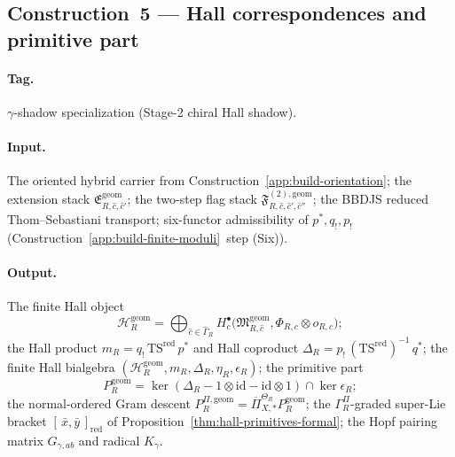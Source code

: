 \subsection{Construction~5 — Hall correspondences and primitive part}
\label{app:build-hall}

\paragraph{Tag.} \(\gamma\)-shadow specialization
(Stage-2 chiral Hall shadow).

\paragraph{Input.}
The oriented hybrid carrier from
Construction~\ref{app:build-orientation}; the extension stack
\(\mathfrak E^{\mathrm{geom}}_{R,\widehat c,\widehat c'}\); the
two-step flag stack
\(\mathfrak F^{(2),\mathrm{geom}}_{R,\widehat c,\widehat c',\widehat c''}\);
the BBDJS reduced Thom--Sebastiani transport; six-functor admissibility
of \(p^*,q_!,p_!\) (Construction~\ref{app:build-finite-moduli}~step
\textup{(Six)}).

\paragraph{Output.}
The finite Hall object
\[
\mathcal H_R^{\mathrm{geom}}
=\bigoplus_{\widehat c\in\widehat\Gamma_R}
H_c^\bullet\!\bigl(
\mathfrak M^{\mathrm{geom}}_{R,\widehat c},
\Phi_{R,c}\otimes o_{R,c}\bigr);
\]
the Hall product \(m_R=q_!\,\mathrm{TS}^{\mathrm{red}}\,p^*\) and Hall
coproduct \(\Delta_R=p_!\,(\mathrm{TS}^{\mathrm{red}})^{-1}\,q^*\); the
finite Hall bialgebra
\((\mathcal H_R^{\mathrm{geom}},m_R,\Delta_R,\eta_R,\epsilon_R)\); the
primitive part
\[
P_R^{\mathrm{geom}}
=\ker(\Delta_R-1\otimes\mathrm{id}-\mathrm{id}\otimes 1)\cap\ker\epsilon_R;
\]
the normal-ordered Gram descent
\(P_R^{\Pi,\mathrm{geom}}
=\overline\Pi_{X,*}^{\Theta_R}P_R^{\mathrm{geom}}\); the
\(\Gamma_R^\Pi\)-graded super-Lie bracket
\([\,\bar x,\bar y\,]_{\mathrm{red}}\) of
Proposition~\ref{thm:hall-primitives-formal};
the Hopf pairing matrix \(G_{\gamma,ab}\) and radical \(K_\gamma\).

